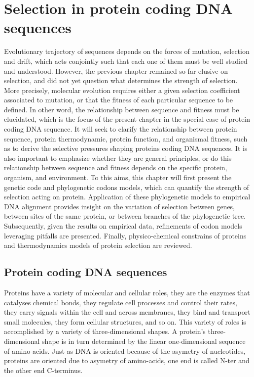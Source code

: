 \chapter{Selection in protein coding {DNA} sequences}
{
	\hypersetup{linkcolor=GREYDARK}
	\minitoc
}
\label{sec:selection}
Evolutionary trajectory of sequences depends on the forces of mutation, selection and drift, which acts conjointly such that each one of them must be well studied and understood.
However, the previous chapter remained so far elusive on selection, and did not yet question what determines the strength of selection.
More precisely, molecular evolution requires either a given selection coefficient associated to mutation, or that the fitness of each particular sequence to be defined.
In other word, the relationship between sequence and fitness must be elucidated, which is the focus of the present chapter in the special case of protein coding \acrshort{DNA} sequence.
It will seek to clarify the relationship between protein sequence, protein thermodynamic, protein function, and organismal fitness, such as to derive the selective pressures shaping proteins coding \acrshort{DNA} sequences.
It is also important to emphasize whether they are general principles, or do this relationship between sequence and fitness depends on the specific protein, organism, and environment.
To this aims, this chapter will first present the genetic code and phylogenetic codons models, which can quantify the strength of selection acting on protein.
Application of these phylogenetic models to empirical DNA alignment provides insight on the variation of selection between genes, between sites of the same protein, or between branches of the phylogenetic tree.
Subsequently, given the results on empirical data, refinements of codon models leveraging pitfalls are presented.
Finally, physico-chemical constrains of proteins and thermodynamics models of protein selection are reviewed.

\section{Protein coding DNA sequences}

Proteins have a variety of molecular and cellular roles, they are the enzymes that catalyses chemical bonds, they regulate cell processes and control their rates, they carry signals within the cell and across membranes, they bind and transport small molecules, they form cellular structures, and so on.
This variety of roles is accomplished by a variety of three-dimensional shapes.
A protein's three-dimensional shape is in turn determined by the linear one-dimensional sequence of amino-acids.
Just as \acrshort{DNA} is oriented because of the asymetry of nucleotides, proteins are oriented due to asymetry of amino-acids, one end is called \gls{N-ter} and the other end C-terminus.

